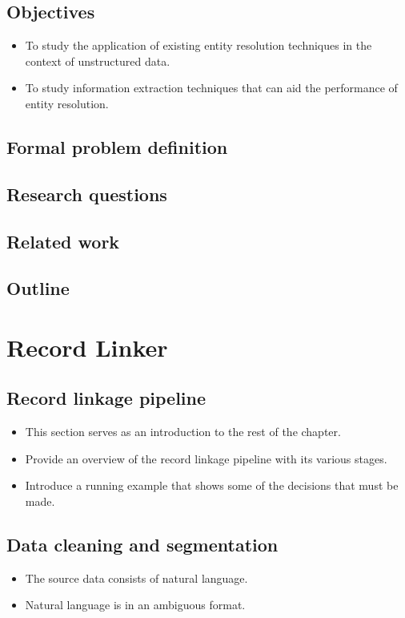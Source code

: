 \documentclass[paper=a4, fontsize=11pt]{scrartcl}
\begin{document}
\subsection{Objectives}
\begin{itemize}
	\item To study the application of existing entity resolution techniques in the context of unstructured data.
	\item To study information extraction techniques that can aid the performance of entity resolution.
\end{itemize}

\subsection{Formal problem definition}

\subsection{Research questions}

\subsection{Related work}

\subsection{Outline}




\section{Record Linker}

\subsection{Record linkage pipeline}
\begin{itemize}
    \item This section serves as an introduction to the rest of the chapter.
    \item Provide an overview of the record linkage pipeline with its various stages.
    \item Introduce a running example that shows some of the decisions that must be made.
\end{itemize}

\subsection{Data cleaning and segmentation}
\begin{itemize}
    \item The source data consists of natural language.
    \item Natural language is in an ambiguous format.
\end{itemize}
\end{document}
